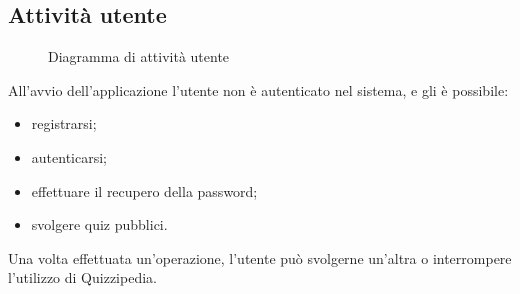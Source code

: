 \documentclass[a4paper, titlepage]{article}
\begin{document}
\subsection{Attività utente}
\begin{figure}[H]
	\centering
	\noindent{}
	\caption{Diagramma di attività utente}
\end{figure}
All’avvio dell’applicazione l’utente non è autenticato nel sistema, e gli è possibile:
\begin{itemize}
	\item registrarsi;
	\item autenticarsi;
	\item effettuare il recupero della password;
	\item svolgere quiz pubblici.
\end{itemize}
Una volta effettuata un’operazione, l’utente può svolgerne un’altra o interrompere l’utilizzo di Quizzipedia.

\newpage
\end{document}
